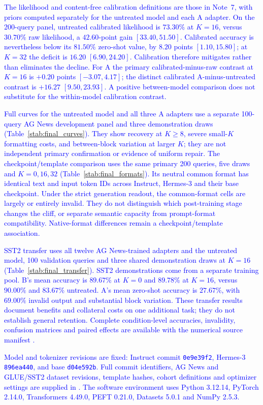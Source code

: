 \textcolor{blue}{The likelihood and content-free calibration definitions are those in Note~7,
with priors computed separately for the untreated model and each A adapter. On the
200-query panel, untreated calibrated likelihood is $73.30\%$ at $K=16$, versus
$30.70\%$ raw likelihood, a $42.60$-point gain $[33.40,51.50]$. Calibrated accuracy
is nevertheless below its $81.50\%$ zero-shot value, by $8.20$ points $[1.10,15.80]$;
at $K=32$ the deficit is $16.20$ $[6.90,24.20]$. Calibration therefore mitigates rather
than eliminates the decline. For A the primary calibrated-minus-raw contrast at
$K=16$ is $+0.20$ points $[-3.07,4.17]$; the distinct calibrated A-minus-untreated
contrast is $+16.27$ $[9.50,23.93]$. A positive between-model comparison does not
substitute for the within-model calibration contrast.}

\textcolor{blue}{Full curves for the untreated model and all three A adapters use a separate
100-query AG News development panel and three demonstration draws
(Table~\ref{stab:final_curves}). They show recovery at $K\geq8$, severe small-$K$
formatting costs, and between-block variation at larger $K$; they are not independent
primary confirmation or evidence of uniform repair. The checkpoint/template
comparison uses the same primary 200 queries, five draws and $K=0,16,32$
(Table~\ref{stab:final_formats}). Its neutral common format has identical text and
input token IDs across Instruct, Hermes-3 and their base checkpoint. Under the strict
generation readout, the common-format cells are largely or entirely invalid. They
do not distinguish which post-training stage changes the cliff, or separate semantic
capacity from prompt-format compatibility. Native-format differences remain a
checkpoint/template association.}

\textcolor{blue}{SST2 transfer uses all twelve AG News-trained adapters and the untreated model,
100 validation queries and three shared demonstration draws at $K=16$
(Table~\ref{stab:final_transfer}). SST2 demonstrations come from a separate training
pool. B's mean accuracy is $89.67\%$ at $K=0$ and $89.78\%$ at $K=16$, versus
$90.00\%$ and $83.67\%$ untreated. A's mean zero-shot accuracy is $27.67\%$, with
$69.00\%$ invalid output and substantial block variation. These transfer results
document benefits and collateral costs on one additional task; they do not establish
general retention. Complete condition-level accuracies, invalidity, confusion matrices
and paired effects are available with the numerical source manifest
.}

\textcolor{blue}{Model and tokenizer revisions are fixed: Instruct commit
\texttt{0e9e39f2}, Hermes-3 \texttt{896ea440}, and base \texttt{d04e592b}.
Full commit identifiers, AG News and GLUE/SST2 dataset revisions, template hashes,
cohort definitions and optimizer settings are supplied in
.
The software environment uses Python 3.12.14, PyTorch 2.14.0, Transformers 4.49.0,
PEFT 0.21.0, Datasets 5.0.1 and NumPy 2.5.3.}
